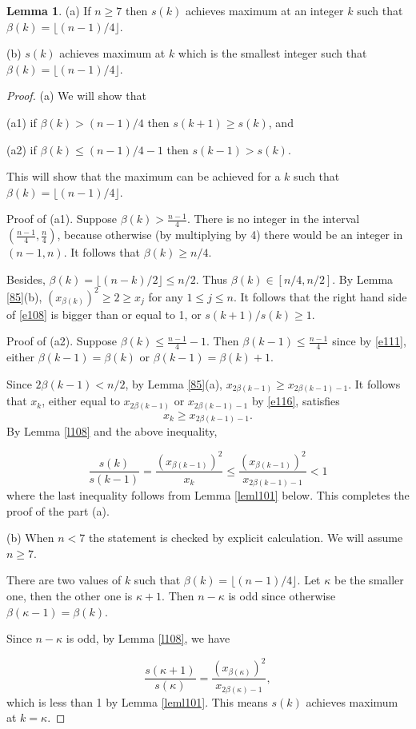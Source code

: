 \documentclass{amsart}
\theoremstyle{definition}
\newtheorem{lemma}[theorem]{Lemma}
\begin{document}
\begin{lemma}\label{l115} (a) If  $n \ge 7$ then $s(k)$ achieves maximum at an integer $k$ such that $\beta(k) = \lfloor (n-1)/4 \rfloor$.

(b) $s(k)$ achieves maximum at $k$ which is the smallest integer such that $\beta(k) = \lfloor (n-1)/4 \rfloor$.
\end{lemma}

\begin{proof} (a)
We will  show that 


(a1) if $\beta(k) >(n-1)/4$ then $s(k+1) \ge  s(k)$, and

(a2) if $ \beta(k) \le  (n-1)/4-1$ then
 $s(k-1) >  s(k)$.
 
This will show that the maximum can be achieved for a $k$ such that  $\beta(k)= \lfloor (n-1)/4 \rfloor$.

Proof of (a1).  Suppose $\beta(k) > \frac{n-1} 4 $. There is no integer in the interval $(\frac{n-1} 4,\frac n 4)$, because otherwise (by multiplying by 4) there would be an integer in $(n-1,n)$. It follows that
$\beta(k) \ge n/4$.


Besides, $\beta(k) = \lfloor (n-k)/2 \rfloor \le n/2$. Thus $\beta(k) \in [n/4, n/2]$.
By Lemma \ref{85}(b), $(x_{\beta(k)})^2 \ge 2 \ge x_{j}$ for any $ 1\le j \le n$.
It follows that the right hand side of \eqref{e108} is bigger than or equal
to 1, or $s(k+1)/s(k) \ge 1$.

Proof of (a2). Suppose $\beta(k) \le  \frac{n-1} 4 -1$. Then  $\beta(k-1) \le  \frac{n-1} 4 $ since by \eqref{e111}, either $\beta(k-1)= \beta(k)$ or $\beta(k-1)=\beta(k)+1$. 


Since   $2\beta(k-1) < n/2$, by Lemma \ref{85}(a), $x_{2\beta(k-1)} \ge x_{2\beta(k-1)-1}$.
It follows that $x_k$, either equal to   $x_{2\beta(k-1)}$ or $x_{2\beta(k-1)-1}$ by \eqref{e116}, satisfies
\begin{equation*}
 x_k \ge x_{2\beta(k-1)-1}.
\end{equation*}
By Lemma \ref{l108} and the above inequality, 

$$
\frac{s(k)}{s(k-1)} = \frac{(x_{\beta(k-1)})^2}{x_{k}}
\le \frac{(x_{\beta(k-1)})^2}{x_{2\beta(k-1)-1}} < 1
$$
where the last inequality follows from Lemma \ref{leml101} below.
This completes the proof of the part (a). 

(b) When $n < 7$ the statement is checked by explicit calculation. We will assume $n\ge 7$.

There are two values of $k$ such that  $\beta(k)= \lfloor (n-1)/4 \rfloor$. Let $\kappa$ be the smaller one, then the other one is $\kappa+1$.
Then $n-\kappa$ is odd since otherwise $\beta(\kappa-1)=\beta(k)$. 

Since $n-\kappa$ is odd, by Lemma  \ref{l108}, we have 

$$ \frac{s(\kappa+1)}{s(\kappa)} = \frac{(x_{\beta(\kappa)})^2}{x_{2\beta(\kappa)-1}},$$
which is less than 1 by Lemma \ref{leml101}. This means $s(k)$ achieves maximum at $k=\kappa$.
\end{proof}
\end{document}
